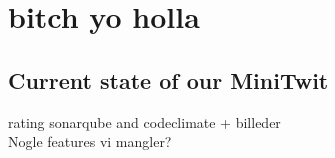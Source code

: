 \section{bitch yo holla}
\subsection{Current state of our MiniTwit}


rating sonarqube and codeclimate + billeder\\
Nogle features vi mangler?